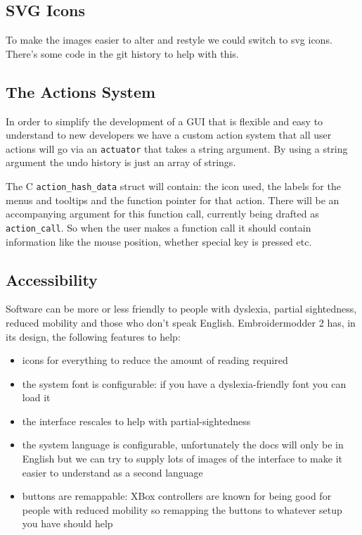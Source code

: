 \documentclass[a4paper]{report}
\begin{document}
\subsection{SVG Icons}

To make the images easier to alter and restyle we could switch to svg icons.
There's some code in the git history to help with this.

\subsection{The Actions System}

In order to simplify the development of a GUI that is flexible and easy to
understand to new developers we have a custom action system that all user
actions will go via an \texttt{actuator} that takes a string argument. By using a
string argument the undo history is just an array of strings.

The C \texttt{action\_hash\_data} struct will contain: the icon used, the
labels for the menus and tooltips and the function pointer for that action.
There will be an accompanying argument for this function call, currently being
drafted as \texttt{action\_call}. So when the user makes a function call it should
contain information like the mouse position, whether special key is pressed etc.

\subsection{Accessibility}

Software can be more or less friendly to people with dyslexia, partial
sightedness, reduced mobility and those who don't speak English. Embroidermodder
2 has, in its design, the following features to help:

\begin{itemize}
\item icons for everything to reduce the amount of reading required
\item the system font is configurable: if you have a dyslexia-friendly font you
    can load it
\item the interface rescales to help with partial-sightedness
\item the system language is configurable, unfortunately the docs will only be
    in English but we can try to supply lots of images of the interface to make it
    easier to understand as a second language
\item buttons are remappable: XBox controllers are known for being good for
    people with reduced mobility so remapping the buttons to whatever setup you have
    should help
\end{itemize}
\end{document}
